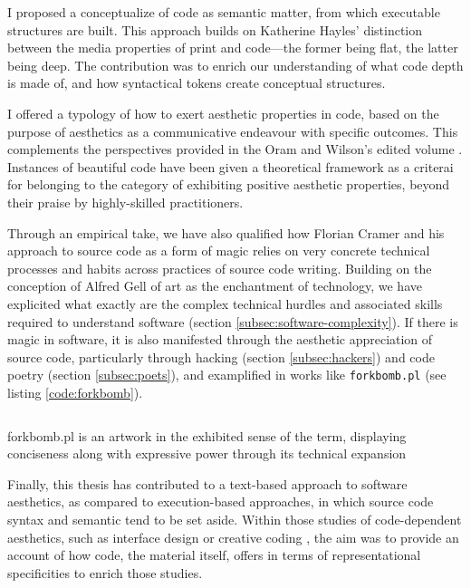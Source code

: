 I proposed a conceptualize of code as semantic matter, from which executable structures are built. This approach builds on Katherine Hayles' distinction between the media properties of print and code—the former being flat, the latter being deep. The contribution was to enrich our understanding of what code depth is made of, and how syntactical tokens create conceptual structures.

I offered a typology of how to exert aesthetic properties in code, based on the purpose of aesthetics as a communicative endeavour with specific outcomes. This complements the perspectives provided in the Oram and Wilson's edited volume \citep{oram_beautiful_2007}. Instances of beautiful code have been given a theoretical framework as a criterai for belonging to the category of exhibiting positive aesthetic properties, beyond their praise by highly-skilled practitioners.

Through an empirical take, we have also qualified how Florian Cramer and his approach to source code as a form of magic relies on very concrete technical processes and habits across practices of source code writing. Building on the conception of Alfred Gell of art as the enchantment of technology, we have explicited what exactly are the complex technical hurdles and associated skills required to understand software (section \ref{subsec:software-complexity}). If there is magic in software, it is also manifested through the aesthetic appreciation of source code, particularly through hacking (section \ref{subsec:hackers}) and code poetry (section \ref{subsec:poets}), and examplified in works like \lstinline{forkbomb.pl} (see listing \ref{code:forkbomb}).

\begin{listing}
    \inputminted{perl}{./corpus/forkbomb.pl}
    \caption[]{forkbomb.pl is an artwork in the exhibited sense of the term, displaying conciseness along with expressive power through its technical expansion}
    \label{code:forkbomb}
\end{listing}

Finally, this thesis has contributed to a text-based approach to software aesthetics, as compared to execution-based approaches, in which source code syntax and semantic tend to be set aside. Within those studies of code-dependent aesthetics, such as interface design \citep{fishwick_aesthetic_2001} or creative coding \citep{cox_aesthetic_2020}, the aim was to provide an account of how code, the material itself, offers in terms of representational specificities to enrich those studies.

